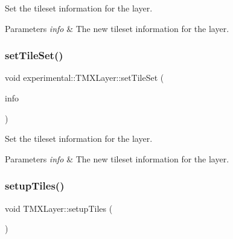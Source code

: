 Set the tileset information for the layer.


\begin{DoxyParams}{Parameters}
{\em info} & The new tileset information for the layer. \\
\hline
\end{DoxyParams}
\mbox{\label{classexperimental_1_1TMXLayer_a864589e3f92c05635f7158922e884c98}} 
\subsubsection{\texorpdfstring{set\+Tile\+Set()}{setTileSet()}\hspace{0.1cm}{\footnotesize\ttfamily [2/2]}}
{\footnotesize\ttfamily void experimental\+::\+T\+M\+X\+Layer\+::set\+Tile\+Set (\begin{DoxyParamCaption}\item[{T\+M\+X\+Tileset\+Info $\ast$}]{info }\end{DoxyParamCaption})\hspace{0.3cm}{\ttfamily [inline]}}

Set the tileset information for the layer.


\begin{DoxyParams}{Parameters}
{\em info} & The new tileset information for the layer. \\
\hline
\end{DoxyParams}
\mbox{\label{classexperimental_1_1TMXLayer_acf9d1ea932daf85d00dce917e40049b7}} 
\subsubsection{\texorpdfstring{setup\+Tiles()}{setupTiles()}\hspace{0.1cm}{\footnotesize\ttfamily [1/2]}}
{\footnotesize\ttfamily void T\+M\+X\+Layer\+::setup\+Tiles (\begin{DoxyParamCaption}{ }\end{DoxyParamCaption})}

